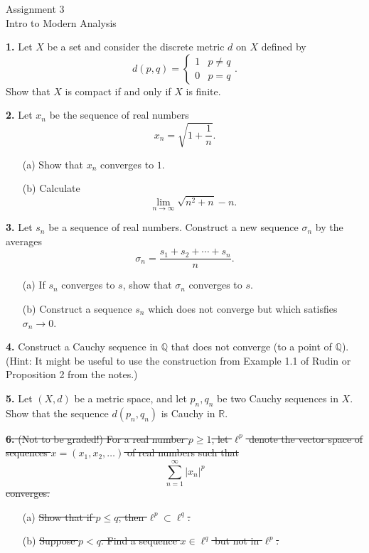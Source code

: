 \documentclass[12pt]{article}
\begin{document}
\begin{center}
Assignment 3\\
Intro to Modern Analysis
\end{center}

\noindent \textbf{1.} Let $X$ be a set and consider the discrete metric $d$ on $X$ defined by  
\[
d(p,q) = \begin{cases}
1 & p \neq q \\
0 & p = q
\end{cases}.
\]
Show that $X$ is compact if and only if $X$ is finite. 

\medskip 

\noindent \textbf{2.} Let $x_n$ be the sequence of real numbers 
\[
x_n = \sqrt{1 + \frac{1}{n}}.
\]
\begin{enumerate}
\item[(a)] Show that $x_n$ converges to $1$. 
\item[(b)] Calculate 
\[
\lim_{n \to \infty} \sqrt{n^2 + n} - n.
\]
\end{enumerate}

\noindent \textbf{3.} Let $s_n$ be a sequence of real numbers. Construct a new sequence $\sigma_n$ by the averages 
\[
\sigma_n = \frac{s_1 + s_2 + \cdots + s_n}{n}.
\]
\begin{enumerate}
\item[(a)] If $s_n$ converges to $s$, show that $\sigma_n$ converges to $s$. 
\item[(b)] Construct a sequence $s_n$ which does not converge but which satisfies $\sigma_n \to 0$. 
\end{enumerate}

\medskip

\noindent \textbf{4.} Construct a Cauchy sequence in $\mathbb{Q}$ that does not converge (to a point of $\mathbb{Q}$). (Hint: It might be useful to use the construction from Example 1.1 of Rudin or Proposition 2 from the notes.)

\medskip

\noindent \textbf{5.} Let $(X,d)$ be a metric space, and let $p_n, q_n$ be two Cauchy sequences in $X$. Show that the sequence $d(p_n, q_n)$ is Cauchy in $\mathbb{R}$. 

\medskip 


\noindent \st{\textbf{6.} (Not to be graded!) For a real number $p \geqslant 1$, let $\ell^p$ denote the vector space of sequences $x = (x_1, x_2, \ldots)$ of real numbers such that}
\[
{\sum_{n=1}^\infty |x_n|^p}
\]
\st{converges.} 
\begin{enumerate}
\item[(a)] \st{Show that if $p \leqslant q$, then $\ell^p \subset \ell^q$.} 
\item[(b)] \st{Suppose $p < q$. Find a sequence $x \in \ell^q$ but not in $\ell^p$.} 
\end{enumerate}
\end{document}
